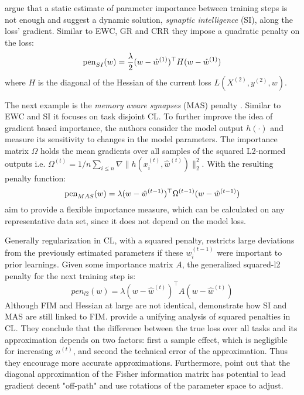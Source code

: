 \citeauthor{zenke2017continuallearningsynapticintelligence} \cite{zenke2017continuallearningsynapticintelligence} argue that a static estimate of parameter importance between training steps is not enough and suggest a dynamic solution, \textit{synaptic intelligence} (SI), along the loss' gradient. Similar to EWC, GR and CRR they impose a quadratic penalty on the loss:
\begin{equation}\label{SI}
	\operatorname{pen}_{SI}(w) = \frac{\lambda}{2} (w - \hat{w}^{(1)})^\top H (w - \hat{w}^{(1)})
\end{equation}
where $H$ is the diagonal of the Hessian of the current loss $L(X^{(2)}, y^{(2)}, w)$.

The next example is the \textit{memory aware synapses} (MAS) penalty \cite{aljundi2018memoryawaresynapseslearning}. Similar to EWC and SI it focuses on task disjoint CL. To further improve the idea of gradient based importance, the authors consider the model output $h(\cdot)$ and measure its sensitivity to changes in the model parameters. The importance matrix $\Omega$ holds the mean gradients over all samples of the squared L2-normed outputs i.e. $\Omega^{(t)} = 1/n \sum_{i \leq n} \nabla \lVert h(x^{(t)}_i, \hat{w}^{(t)}) \rVert_2^2$. With the resulting penalty function:
\begin{equation}\label{MAS}
	\operatorname{pen}_{MAS}(w)=\lambda (w - \hat{w}^{(t-1)})^\top \Omega^{(t-1)} (w - \hat{w}^{(t-1)})
\end{equation}
\citeauthor{aljundi2018memoryawaresynapseslearning} \cite{aljundi2018memoryawaresynapseslearning} aim to provide a flexible importance measure, which can be calculated on any representative data set, since it does not depend on the model loss.

Generally regularization in CL, with a squared penalty, restricts large deviations from the previously estimated parameters if these $w_i^{(t-1)}$ were important to prior learnings. Given some importance matrix $A$, the generalized squared-l2 penalty for the next training step is:
\begin{equation}\label{l2pen}
	pen_{l2}(w) = \lambda (w - \hat{w}^{(t)})^\top A (w - \hat{w}^{(t)})
\end{equation}
Although FIM and Hessian at large are not identical, \citeauthor{benzing2021unifyingregularisationmethodscontinual} \cite{benzing2021unifyingregularisationmethodscontinual} demonstrate how SI and MAS are still linked to FIM. \citeauthor{yin2021optimizationgeneralizationregularizationbasedcontinual} \cite{yin2021optimizationgeneralizationregularizationbasedcontinual} provide a unifying analysis of squared penalties in CL. They conclude that the difference between the true loss over all tasks and its approximation depends on two factors: first a sample effect, which is negligible for increasing $n^{(t)}$, and second the technical error of the approximation. Thus they encourage more accurate approximations. Furthermore, \citeauthor{liu2018rotatenetworksbetterweight} \cite{liu2018rotatenetworksbetterweight} point out that the diagonal approximation of the Fisher information matrix has potential to lead gradient decent "off-path" and use rotations of the parameter space to adjust.
